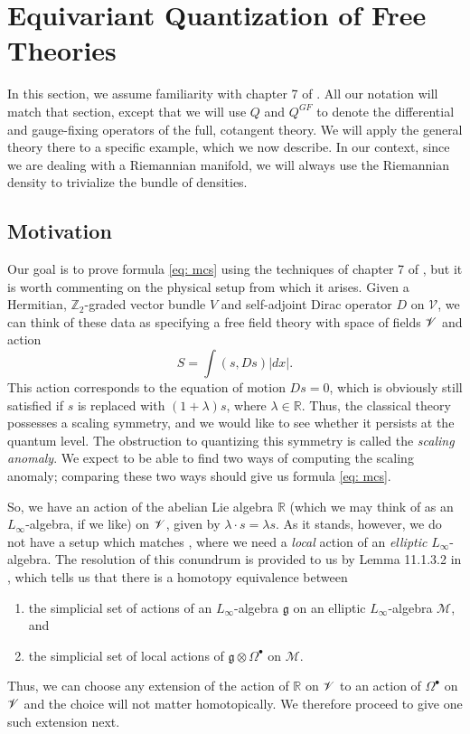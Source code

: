 \documentclass[11pt]{amsart}
\newcommand{\Z}{\mathbb Z}
\newcommand{\mbb}{\mathbb}
\newcommand{\R}{\mbb R}
\def\sM{\mathscr M}\def\sN{\mathscr N}\def\sO{\mathscr O}\def\sP{\mathscr P}
\numberwithin{equation}{section}
\begin{document}
\section{Equivariant Quantization of Free Theories}
In this section, we assume familiarity with chapter 7 of \cite{ref: othesis}. All our notation will match that section, except that we will use $Q$ and $Q^{GF}$ to denote the differential and gauge-fixing operators of the full, cotangent theory. We will apply the general theory there to a specific example, which we now describe. In our context, since we are dealing with a Riemannian manifold, we will always use the Riemannian density to trivialize the bundle of densities.

\subsection{Motivation}
Our goal is to prove formula \ref{eq: mcs} using the techniques of chapter 7 of \cite{ref: othesis}, but it is worth commenting on the physical setup from which it arises. Given a Hermitian, $\Z_2$-graded vector bundle $V$ and  self-adjoint Dirac operator $D$ on $\mathscr V$, we can think of these data as specifying a free field theory with space of fields $\mathscr V$ and action 
\[
S = \int \left( s, Ds\right)|dx|.
\] 
This action corresponds to the equation of motion $Ds=0$, which is obviously still satisfied if $s$ is replaced with $(1+\lambda )s$, where $\lambda\in \R$. Thus, the classical theory possesses a scaling symmetry, and we would like to see whether it persists at the quantum level. The obstruction to quantizing this symmetry is called the {\em scaling anomaly}. We expect to be able to find two ways of computing the scaling anomaly; comparing these two ways should give us formula \ref{eq: mcs}.

So, we have an action of the abelian Lie algebra $\R$ (which we may think of as an $L_\infty$-algebra, if we like) on $\mathscr V$, given by $\lambda\cdot s = \lambda s$. As it stands, however, we do not have a setup which matches \cite{othesis}, where we need a {\em local} action of an {\em elliptic} $L_\infty$-algebra. The resolution of this conundrum is provided to us by Lemma 11.1.3.2 in \cite{ref: CG2}, which tells us that there is a homotopy equivalence between
\begin{enumerate}
\item the simplicial set of actions of an $L_\infty$-algebra $\mathfrak g$ on an elliptic $L_\infty$-algebra $\sM$, and
\item the simplicial set of local actions of $\mathfrak g \otimes \Omega^\bullet$ on $\sM$.
\end{enumerate}
Thus, we can choose any extension of the action of $\R$ on $\mathscr V$ to an action of $\Omega^\bullet$ on $\mathscr V$ and the choice will not matter homotopically. We therefore proceed to give one such extension next.
\end{document}
